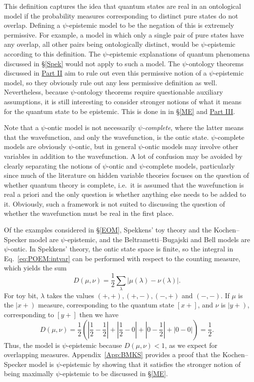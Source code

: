 \documentclass[DIV=calc,paper=a4,fontsize=11pt,twocolumn]{scrartcl} %
\theoremstyle{definition}
\theoremstyle{plain}
\newcommand{\RKet}[1]{\ensuremath{\left \vert #1 \right )}}
\newcommand{\Proj}[1]{\ensuremath{\left [ #1 \right ]}}
\begin{document}
This definition captures the idea that quantum states are real in an
ontological model if the probability measures corresponding to
distinct pure states do not overlap.  Defining a $\psi$-epistemic
model to be the negation of this is extremely permissive.  For
example, a model in which only a single pair of pure states have any
overlap, all other pairs being ontologically distinct, would be
$\psi$-epistemic according to this definition.  The $\psi$-epistemic
explanations of quantum phenomena discussed in \S\ref{Spek} would not
apply to such a model.  The $\psi$-ontology theorems discussed in
\hyperref[SPON]{Part II} aim to rule out even this permissive notion of a
$\psi$-epistemic model, so they obviously rule out any less permissive
definition as well.  Nevertheless, because $\psi$-ontology theorems
require questionable auxiliary assumptions, it is still interesting to
consider stronger notions of what it means for the quantum state to be
epistemic.  This is done in in \S\ref{ME} and \hyperref[Beyond]{Part III}.

Note that a $\psi$-ontic model is not necessarily
\emph{$\psi$-complete}, where the latter means that the wavefunction,
and only the wavefunction, is the ontic state.  $\psi$-complete models
are obviously $\psi$-ontic, but in general $\psi$-ontic models may
involve other variables in addition to the wavefunction.  A lot of
confusion may be avoided by clearly separating the notions of
$\psi$-ontic and $\psi$-complete models, particularly since much of
the literature on hidden variable theories focuses on the question of
whether quantum theory is complete, i.e.\ it is assumed that the
wavefunction is real a priori and the only question is whether
anything else needs to be added to it.  Obviously, such a framework is
not suited to discussing the question of whether the wavefunction must
be real in the first place.

Of the examples considered in \S\ref{EOM}, Spekkens' toy theory and
the Kochen--Specker model are $\psi$-epistemic, and the
Beltrametti--Bugajski and Bell models are $\psi$-ontic.  In Spekkens'
theory, the ontic state space is finite, so the integral in
Eq.~\eqref{eq:POEM:intvar} can be performed with respect to the
counting measure, which yields the sum
\begin{equation}
D(\mu,\nu) = \frac{1}{2} \sum_{\lambda} |\mu(\lambda) - \nu(\lambda)
|.
\end{equation}
For toy bit, $\lambda$ takes the values $(+,+), (+,-), (-,+)$ and
$(-,-)$.  If $\mu$ is the $\RKet{x+}$ measure, corresponding to the
quantum state $\Proj{x+}$, and $\nu$ is $\RKet{y+}$, corresponding to
$\Proj{y+}$ then we have
\begin{equation}
D(\mu,\nu) = \frac{1}{2} \left ( \left | \frac{1}{2}-\frac{1}{2}
\right | + \left | \frac{1}{2}-0 \right | +
\left | 0-\frac{1}{2} \right | + \left | 0-0 \right | \right ) =
\frac{1}{2}.
\end{equation}
Thus, the model is $\psi$-epistemic because $D(\mu,\nu) < 1$, as we
expect for overlapping measures.  Appendix~\ref{App:BMKS} provides a
proof that the Kochen--Specker model is $\psi$-epistemic by showing
that it satisfies the stronger notion of being maximally
$\psi$-epistemic to be discussed in \S\ref{ME}.
\end{document}

